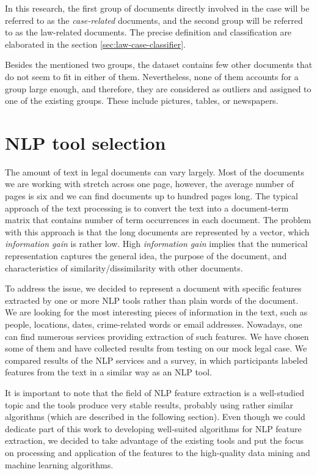 \documentclass[
  digital, %
  notable,   %
  nolof,     %
  nolot,     %
]{fithesis3}
\begin{document}
In this research, the first group of documents directly involved in the case will be referred to as the \textit{case-related} documents, and the second group will be referred to as the law-related documents.
The precise definition and classification are elaborated in the section \ref{sec:law-case-classifier}.

Besides the mentioned two groups, the dataset contains few other documents that do not seem to fit in either of them.
Nevertheless, none of them accounts for a group large enough, and therefore, they are considered as outliers and assigned to one of the existing groups.
These include pictures, tables, or newspapers.

\chapter{NLP tool selection}
\label{chp:nlp}
The amount of text in legal documents can vary largely.
Most of the documents we are working with stretch across one page, however, the average number of pages is six and we can find documents up to hundred pages long.
The typical approach of the text processing is to convert the text into a document-term matrix that contains number of term occurrences in each document.
The problem with this approach is that the long documents are represented by a vector, which \emph{information gain} is rather low.
High \emph{information gain} implies that the numerical representation captures the general idea, the purpose of the document, and characteristics of similarity/dissimilarity with other documents.

To address the issue, we decided to represent a document with specific features extracted by one or more NLP tools rather than plain words of the document.
We are looking for the most interesting pieces of information in the text, such as people, locations, dates, crime-related words or email addresses.
Nowadays, one can find numerous services providing extraction of such features.
We have chosen some of them and have collected results from testing on our mock legal case.
We compared results of the NLP services and a survey, in which participants labeled features from the text in a similar way as an NLP tool.

It is important to note that the field of NLP feature extraction is a well-studied topic and the tools produce very stable results, probably using rather similar algorithms (which are described in the following section). Even though we could dedicate part of this work to developing well-suited algorithms for NLP feature extraction, we decided to take advantage of the existing tools and put the focus on processing and application of the features to the high-quality data mining and machine learning algorithms. 
\end{document}
